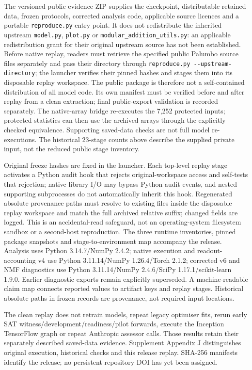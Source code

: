 \documentclass[
  british,
  11pt,
  a4paper,
]{article}
\begin{document}
The versioned public evidence ZIP supplies the checkpoint, distributable
retained data, frozen protocols, corrected analysis code, applicable
source licences and a portable \texttt{reproduce.py} entry point. It
does not redistribute the inherited upstream \texttt{model.py},
\texttt{plot.py} or \texttt{modular\_addition\_utils.py}: an applicable
redistribution grant for their original upstream source has not been
established. Before native replay, readers must retrieve the specified
public Palumbo source files separately and pass their directory through
\texttt{reproduce.py\ -\/-upstream-directory}; the launcher verifies
their pinned hashes and stages them into its disposable replay
workspace. The public package is therefore not a self-contained
distribution of all model code. Its own manifest must be verified before
and after replay from a clean extraction; final public-export validation
is recorded separately. The native-array bridge re-executes the 7,252
protected inputs; protected statistics can then use the archived arrays
through the explicitly checked equivalence. Supporting saved-data checks
are not full model re-executions. The historical 23-stage counts above
describe the supplied private input, not the reduced public stage
inventory.

Original freeze hashes are fixed in the launcher. Each top-level replay
stage activates a Python audit hook that rejects original-workspace
access and self-tests that rejection; native-library I/O may bypass
Python audit events, and nested supporting subprocesses do not
automatically inherit this hook. Regenerated absolute provenance paths
must resolve to existing files inside the disposable replay workspace
and match the full archived relative suffix; changed fields are logged.
This is an accidental-read safeguard, not an operating-system filesystem
sandbox or a second-host reproduction. The three runtime inventories,
pinned package snapshots and stage-to-environment map accompany the
release. Analysis uses Python 3.14.7/NumPy 2.4.2; native execution and
readout-accounting v4 use Python 3.11.14/NumPy 1.26.4/Torch 2.1.2;
corrected v6 and NMF diagnostics use Python 3.11.14/NumPy 2.4.6/SciPy
1.17.1/scikit-learn 1.9.0. Earlier diagnostic exports remain explicitly
superseded. A machine-readable claim map connects reported values to
artifact keys and replay stages. Historical absolute paths in frozen
records are provenance, not required input locations.

The clean replay does not retrain models, repeat legacy optimiser fits,
rerun early SAT witness/development/readiness/pilot forwards, execute
the Inception TensorFlow graph or repeat Anthropic assessor calls. Those
results retain their separately described saved-data evidence.
Supplement Appendix J distinguishes original execution, historical
checks and this release replay. SHA-256 manifests identify the release;
no persistent repository DOI has yet been assigned.
\end{document}
